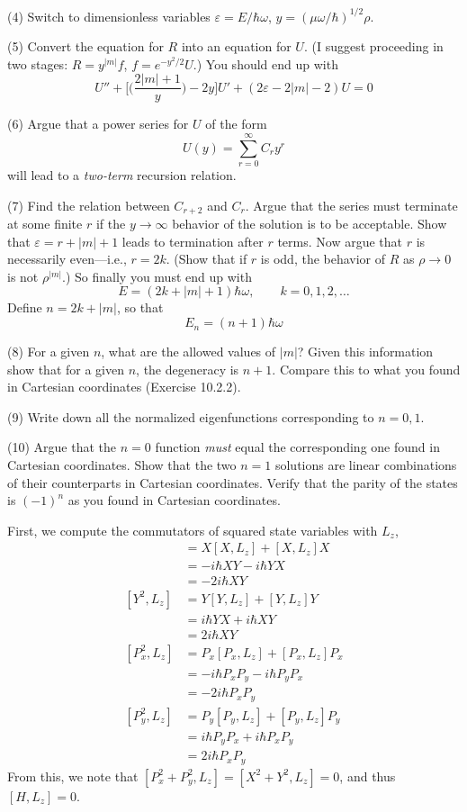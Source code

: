 \documentclass[../principles-of-quantum-mechanics.tex]{subfiles}
\begin{document}
\begin{questions}
	(4) Switch to dimensionless variables $\varepsilon = E/\hbar\omega$, $y = (\mu\omega/\hbar)^{1/2}\rho$.
	
	(5) Convert the equation for $R$ into an equation for $U$. (I suggest proceeding in two stages: $R = y^{|m|}f$, $f = e^{-y^2/2}U$.) You should end up with
	$$U'' + \Big[\Big(\frac{2|m| + 1}{y}\Big) - 2y\Big]U' + (2\varepsilon - 2|m| - 2)U = 0$$
	
	(6) Argue that a power series for $U$ of the form
	$$U(y) = \sum_{r=0}^{\infty}C_ry^r$$
	will lead to a \textit{two-term} recursion relation.
	
	(7) Find the relation between $C_{r+2}$ and $C_r$. Argue that the series must terminate at some finite $r$ if the $y\to\infty$ behavior of the solution is to be acceptable. Show that $\varepsilon = r + |m| + 1$ leads to termination after $r$ terms. Now argue that $r$ is necessarily even---i.e., $r = 2k$. (Show that if $r$ is odd, the behavior of $R$ as $\rho \to 0$ is not $\rho^{|m|}$.) So finally you must end up with
	$$E = (2k + |m| + 1)\hbar\omega, \qquad k = 0, 1, 2, \dots$$
	Define $n = 2k + |m|$, so that
	$$E_n = (n + 1)\hbar\omega$$
	
	(8) For a given $n$, what are the allowed values of $|m|$? Given this information show that for a given $n$, the degeneracy is $n + 1$. Compare this to what you found in Cartesian coordinates (Exercise 10.2.2).
	
	(9) Write down all the normalized eigenfunctions corresponding to $n = 0, 1$.
	
	(10) Argue that the $n = 0$ function \textit{must} equal the corresponding one found in Cartesian coordinates. Show that the two $n = 1$ solutions are linear combinations of their counterparts in Cartesian coordinates. Verify that the parity of the states is $(-1)^n$ as you found in Cartesian coordinates.
	\begin{solution}
		First, we compute the commutators of squared state variables with $L_z$,
		\begin{align*}
			[X^2, L_z] &= X[X, L_z] + [X, L_z]X \\
			&= -i\hbar XY - i\hbar YX \\
			&= -2i\hbar XY \\
			[Y^2, L_z] &= Y[Y, L_z] + [Y, L_z]Y \\
			&= i\hbar YX + i\hbar XY \\
			&= 2i\hbar XY \\
			[P_x^2, L_z] &= P_x[P_x, L_z] + [P_x, L_z]P_x \\
			&= -i\hbar P_xP_y - i\hbar P_yP_x \\
			&= -2i\hbar P_xP_y \\
			[P_y^2, L_z] &= P_y[P_y, L_z] + [P_y, L_z]P_y \\
			&= i\hbar P_yP_x + i\hbar P_xP_y \\
			&= 2i\hbar P_xP_y
		\end{align*}
		From this, we note that $[P_x^2 + P_y^2, L_z] = [X^2 + Y^2, L_z] = 0$, and thus $[H, L_z] = 0$.
		

\end{solution}
\end{questions}
\end{document}
